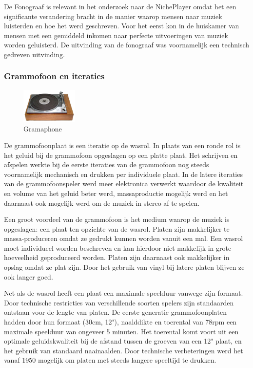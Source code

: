 De Fonograaf is relevant in het onderzoek naar de NichePlayer omdat het een significante verandering bracht in de manier waarop mensen naar muziek luisterden en hoe het werd geschreven. Voor het eerst kon in de huiskamer van mensen met een gemiddeld inkomen naar perfecte uitvoeringen van muziek worden geluisterd. De uitvinding van de fonograaf was voornamelijk een technisch gedreven uitvinding.


\subsubsection*{Grammofoon en iteraties}
\begin{figure}
    \centering
    \includegraphics[width=0.25\textwidth]{assets/critical-review/Gramaphone.jpeg}
    \caption{Gramaphone}
    \label{fig:critical-review:Gramaphone}
\end{figure}
De grammofoonplaat is een iteratie op de wasrol. In plaats van een ronde rol is het geluid bij de grammofoon opgeslagen op een platte plaat. Het schrijven en afspelen werkte bij de eerste iteraties van de grammofoon nog steeds voornamelijk mechanisch en drukken per individuele plaat. In de latere iteraties van de grammofoonspeler werd meer elektronica verwerkt waardoor de kwaliteit en volume van het geluid beter werd, massaproductie mogelijk werd en het daarnaast ook mogelijk werd om de muziek in stereo af te spelen.

Een groot voordeel van de grammofoon is het medium waarop de muziek is opgeslagen: een plaat ten opzichte van de wasrol. Platen zijn makkelijker te massa-produceren omdat ze gedrukt kunnen worden vanuit een mal. Een wasrol moet individueel worden beschreven en kan hierdoor niet makkelijk in grote hoeveelheid geproduceerd worden. Platen zijn daarnaast ook makkelijker in opslag omdat ze plat zijn. Door het gebruik van vinyl bij latere platen blijven ze ook langer goed.

Net als de wasrol heeft een plaat een maximale speelduur vanwege zijn formaat. Door technische restricties van verschillende soorten spelers zijn standaarden ontstaan voor de lengte van platen. De eerste generatie grammofoonplaten hadden door hun formaat (30cm, 12"), naalddikte en toerental van 78rpm een maximale speelduur van ongeveer 5 minuten. Het toerental komt voort uit een optimale geluidskwaliteit bij de afstand tussen de groeven van een 12" plaat, en het gebruik van standaard naainaalden. Door technische verbeteringen werd het vanaf 1950 mogelijk om platen met steeds langere speeltijd te drukken. 

